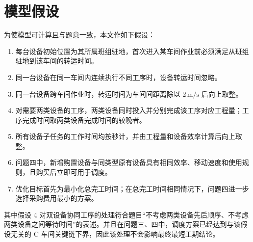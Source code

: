\section{模型假设}

为使模型可计算且与题意一致，本文作如下假设：
\begin{enumerate}
  \item 每台设备初始位置为其所属班组驻地，首次进入某车间作业前必须满足从班组驻地到该车间的转运时间。
  \item 同一台设备在同一车间内连续执行不同工序时，设备转运时间忽略。
  \item 同一台设备跨车间作业时，转运时间为车间间距离除以 $2\,\mathrm{m/s}$ 后向上取整。
  \item 对需要两类设备的工序，两类设备同时投入并分别完成该工序对应工程量；工序完成时间取两类设备完成时间的较晚者。
  \item 所有设备子任务的工作时间均按秒计，并由工程量和设备效率计算后向上取整。
  \item 问题四中，新增购置设备与同类型原有设备具有相同效率、移动速度和使用规则，且购买后立即可用于调度。
  \item 优化目标首先为最小化总完工时间；在总完工时间相同情况下，问题四进一步选择采购费用最小的方案。
\end{enumerate}

其中假设 4 对双设备协同工序的处理符合题目``不考虑两类设备先后顺序、不考虑两类设备之间等待时间''的表述。并且在问题三、四中，调度方案已经达到与该假设无关的 C 车间关键链下界，因此该处理不会影响最终最短工期结论。
